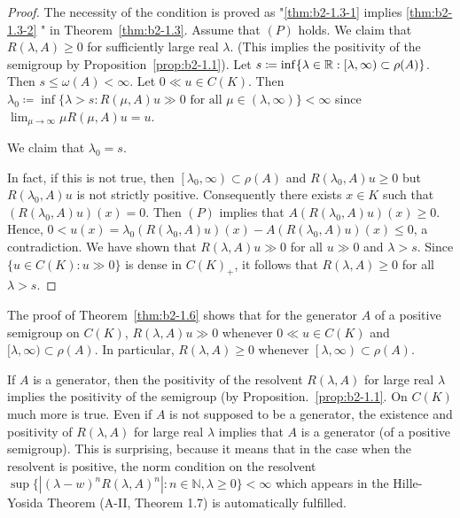 \begin{proof}
The necessity of the condition is proved as "\ref{thm:b2-1.3-1} implies \ref{thm:b2-1.3-2} " in Theorem~\ref{thm:b2-1.3}.
Assume that $(P)$ holds.
We claim that $R(\lambda,A) \geq 0$ for sufficiently large real $\lambda$. 
(This implies the positivity of the semigroup by Proposition~\ref{prop:b2-1.1}).
Let $s \coloneqq \inf \{\lambda \in \mathbb{R} : \left[\lambda,\infty \right) \subset \rho(A)\}$.
Then $s \leq \omega(A) < \infty$.
Let $0 \ll u \in C(K)$.
Then $\lambda_{0} \coloneqq \inf \{\lambda > s : R(\mu,A)u \gg 0 \text{ for all } \mu \in (\lambda,\infty)\} < \infty$ since $\lim_{\mu \to \infty} \mu R(\mu,A)u = u$.

We claim that $\lambda_{0} = s$.

In fact, if this is not true, then $\left[\lambda_{0},\infty\right) \subset \rho(A)$ and $R(\lambda_{0},A)u \geq 0$ but $R(\lambda_{0},A)u$ is not strictly positive.
Consequently there exists $x \in K$ such that $(R(\lambda_{0},A)u)(x) = 0$.
Then $(P)$ implies that $A(R(\lambda_{0},A)u)(x) \geq 0$.
Hence, $0 < u(x) = \lambda_{0}(R(\lambda_{0},A)u)(x) - A(R(\lambda_{0},A)u)(x) \leq 0$, a contradiction.
We have shown that $R(\lambda,A)u \gg 0$ for all $u \gg 0$ and $\lambda > s$.
Since $\{u \in C(K): u \gg 0\}$ is dense in $C(K)_{+}$, it follows that $R(\lambda,A) \geq 0$ for all $\lambda > s$.
\end{proof}

\begin{remark}\label{rem:b2-1.7}
The proof of Theorem~\ref{thm:b2-1.6} shows that for the generator $A$ of a positive semigroup on $C(K)$, $R(\lambda,A)u \gg 0$ whenever $0 \ll u \in C(K)$ and $[\lambda,\infty) \subset \rho(A)$.
In particular, $R(\lambda,A) \geq 0$ whenever $\left[\lambda,\infty\right) \subset \rho(A)$.
\end{remark}

If $A$ is a generator, then the positivity of the resolvent $R(\lambda,A)$ for large real $\lambda$ implies the positivity of the semigroup (by Proposition.~\ref{prop:b2-1.1}.
On $C(K)$ much more is true.
Even if $A$ is not supposed to be a generator, the existence and positivity of $R(\lambda,A)$ for large real $\lambda$ implies that $A$ is a generator (of a positive semigroup).
This is surprising, because it means that in the case when the resolvent is positive, the norm condition on the resolvent $\sup \{|(\lambda-w)^{n}R(\lambda,A)^{n}| : n \in \mathbb{N}, \lambda \geq 0\} < \infty$ which appears in the Hille-Yosida Theorem (A-II, Theorem 1.7) is automatically fulfilled.


